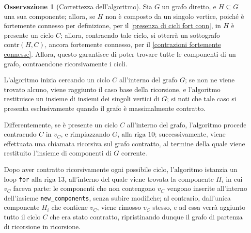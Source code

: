 \documentclass[14pt]{extreport}
\theoremstyle{definition}
\theoremstyle{definition}
\newtheorem{remark}{Osservazione}[subsection]
\begin{document}
\begin{remark}[Correttezza dell'algoritmo]
    Sia $G$ un grafo diretto, e $H \subseteq G$ una sua componente; allora, se $H$ non è composto da un singolo vertice, poiché è fortemente connesso per definizione, per il \cref{presenza di cicli fort conn}, in $H$ è presente un ciclo $C$; allora, contraendo tale ciclo, si otterrà un sottografo $\mathrm{contr}(H, C)$, ancora fortemente connesso, per il \cref{contrazioni fortemente connesse}. Allora, questo garantisce di poter trovare tutte le componenti di un grafo, contraendone ricorsivamente i cicli.

    L'algoritmo inizia cercando un ciclo $C$ all'interno del grafo $G$; se non ne viene trovato alcuno, viene raggiunto il caso base della ricorsione, e l'algoritmo restituisce un insieme di insiemi dei singoli vertici di $G$; si noti che tale caso si presenta esclusivamente quando il grafo è massimalmente contratto.

    Differentemente, se è presente un ciclo $C$ all'interno del grafo, l'algoritmo procede contraendo $C$ in $v_C$, e rimpiazzando $G$, alla riga $10$; successivamente, viene effettuata una chiamata ricorsiva sul grafo contratto, al termine della quale viene restituito l'insieme di componenti di $G$ corrente.

    Dopo aver contratto ricorsivamente ogni possibile ciclo, l'algoritmo istanzia un loop \texttt{for} alla riga $13$, all'interno del quale viene trovata la componente $H_i$ in cui $v_C$ faceva parte: le componenti che non contengono $v_C$ vengono inserite all'interno dell'insieme \texttt{new\_components}, senza subire modifiche; al contrario, dall'unica componente $H_i$ che contiene $v_C$, viene rimosso $v_C$ stesso, e ad essa verrà aggiunto tutto il ciclo $C$ che era stato contratto, ripristinando dunque il grafo di partenza di ricorsione in ricorsione.
\end{remark}
\end{document}
